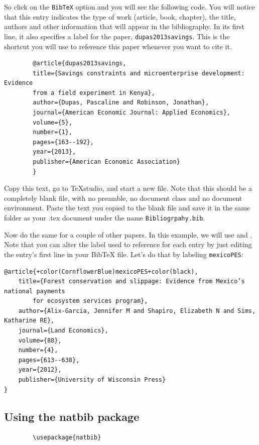 \documentclass[12pts]{article}
\begin{document}
	So click on the \texttt{BibTeX} option and you will see the following code. 	You will notice that this entry indicates the type of work (article, book, chapter), the title, authors and other information that will appear in the bibliography. In its first line, it also specifies a label for the paper, \texttt{dupas2013savings}. This is the shortcut you will use to reference this paper whenever you want to cite it.

	\begin{Verbatim}
		@article{dupas2013savings,
		title={Savings constraints and microenterprise development: Evidence 
		from a field experiment in Kenya},
		author={Dupas, Pascaline and Robinson, Jonathan},
		journal={American Economic Journal: Applied Economics},
		volume={5},
		number={1},
		pages={163--192},
		year={2013},
		publisher={American Economic Association}
		}
	\end{Verbatim}
	
	Copy this text, go to TeXstudio, and start a new file. Note that this should be a completely blank file, with no preamble, no document class and no document environment. Paste the text you copied to the blank file and save it in the same folder as your .tex document under the name \texttt{Bibliogrpahy.bib}.
	
	Now do the same for a couple of other papers. In this example, we will use \citeauthor*{de2008returns} \citeyearpar{de2008returns} and \citeauthor*{alix2012forest} \citeyearpar{alix2012forest}. Note that you can alter the label used to reference for each entry by just editing the entry's first line in your BibTeX file. Let's do that by labeling \citeauthor*{alix2012forest} \citeyearpar{alix2012forest} \texttt{mexicoPES}:
	
	\begin{Verbatim}[commandchars=+\(\)]
@article{+color(CornflowerBlue)mexicoPES+color(black),
	title={Forest conservation and slippage: Evidence from Mexico’s national payments 
		for ecosystem services program},
	author={Alix-Garcia, Jennifer M and Shapiro, Elizabeth N and Sims, Katharine RE},
	journal={Land Economics},
	volume={88},
	number={4},
	pages={613--638},
	year={2012},
	publisher={University of Wisconsin Press}
}
	\end{Verbatim}
	
	\subsection{Using the natbib package}
	
	\begin{verbatim}
		\usepackage{natbib}
		
	\end{verbatim}
	
\end{document}
